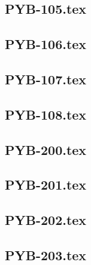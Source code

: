 \renewcommand{\xxexo}{PYB-105.tex} 
\subsection*{\xxexo} 
\graphicspath{{../../exospython_bases/equadiffs/\xxexo/}}
 
 
\renewcommand{\xxexo}{PYB-106.tex} 
\subsection*{\xxexo} 
\graphicspath{{../../exospython_bases/equadiffs/\xxexo/}}
 
 
\renewcommand{\xxexo}{PYB-107.tex} 
\subsection*{\xxexo} 
\graphicspath{{../../exospython_bases/equadiffs/\xxexo/}}
 
 
\renewcommand{\xxexo}{PYB-108.tex} 
\subsection*{\xxexo} 
\graphicspath{{../../exospython_bases/equadiffs/\xxexo/}}
 
 
\renewcommand{\xxexo}{PYB-200.tex} 
\subsection*{\xxexo} 
\graphicspath{{../../exospython_bases/equadiffs/\xxexo/}}
 
 
\renewcommand{\xxexo}{PYB-201.tex} 
\subsection*{\xxexo} 
\graphicspath{{../../exospython_bases/equadiffs/\xxexo/}}
 
 
\renewcommand{\xxexo}{PYB-202.tex} 
\subsection*{\xxexo} 
\graphicspath{{../../exospython_bases/equadiffs/\xxexo/}}
 
 
\renewcommand{\xxexo}{PYB-203.tex} 
\subsection*{\xxexo} 
\graphicspath{{../../exospython_bases/equadiffs/\xxexo/}}
 
 
